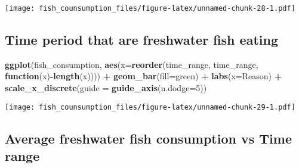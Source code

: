 \documentclass[
]{article}
\newenvironment{Shaded}{\begin{snugshade}}{\end{snugshade}}
\newcommand{\AttributeTok}[1]{\textcolor[rgb]{0.13,0.29,0.53}{#1}}
\newcommand{\ControlFlowTok}[1]{\textcolor[rgb]{0.13,0.29,0.53}{\textbf{#1}}}
\newcommand{\DecValTok}[1]{\textcolor[rgb]{0.00,0.00,0.81}{#1}}
\newcommand{\FunctionTok}[1]{\textcolor[rgb]{0.13,0.29,0.53}{\textbf{#1}}}
\newcommand{\NormalTok}[1]{#1}
\newcommand{\OtherTok}[1]{\textcolor[rgb]{0.56,0.35,0.01}{#1}}
\newcommand{\SpecialCharTok}[1]{\textcolor[rgb]{0.81,0.36,0.00}{\textbf{#1}}}
\newcommand{\StringTok}[1]{\textcolor[rgb]{0.31,0.60,0.02}{#1}}
\begin{document}
\texttt{[image: fish\_counsumption\_files/figure-latex/unnamed-chunk-28-1.pdf]}

\hypertarget{time-period-that-are-freshwater-fish-eating}{%
\subsection{Time period that are freshwater fish
eating}\label{time-period-that-are-freshwater-fish-eating}}

\begin{Shaded}
\begin{Highlighting}[]
\FunctionTok{ggplot}\NormalTok{(fish\_consumption, }\FunctionTok{aes}\NormalTok{(}\AttributeTok{x=}\FunctionTok{reorder}\NormalTok{(time\_range, time\_range, }\ControlFlowTok{function}\NormalTok{(x)}\SpecialCharTok{{-}}\FunctionTok{length}\NormalTok{(x)))) }\SpecialCharTok{+}
  \FunctionTok{geom\_bar}\NormalTok{(}\AttributeTok{fill=}\StringTok{\textquotesingle{}green\textquotesingle{}}\NormalTok{) }\SpecialCharTok{+} 
  \FunctionTok{labs}\NormalTok{(}\AttributeTok{x=}\StringTok{\textquotesingle{}Reason\textquotesingle{}}\NormalTok{) }\SpecialCharTok{+}
  \FunctionTok{scale\_x\_discrete}\NormalTok{(}\AttributeTok{guide =} \FunctionTok{guide\_axis}\NormalTok{(}\AttributeTok{n.dodge=}\DecValTok{5}\NormalTok{))}
\end{Highlighting}
\end{Shaded}

\texttt{[image: fish\_counsumption\_files/figure-latex/unnamed-chunk-29-1.pdf]}

\hypertarget{average-freshwater-fish-consumption-vs-time-range}{%
\subsection{Average freshwater fish consumption vs Time
range}\label{average-freshwater-fish-consumption-vs-time-range}}

\begin{Shaded}
\end{Shaded}
\end{document}
